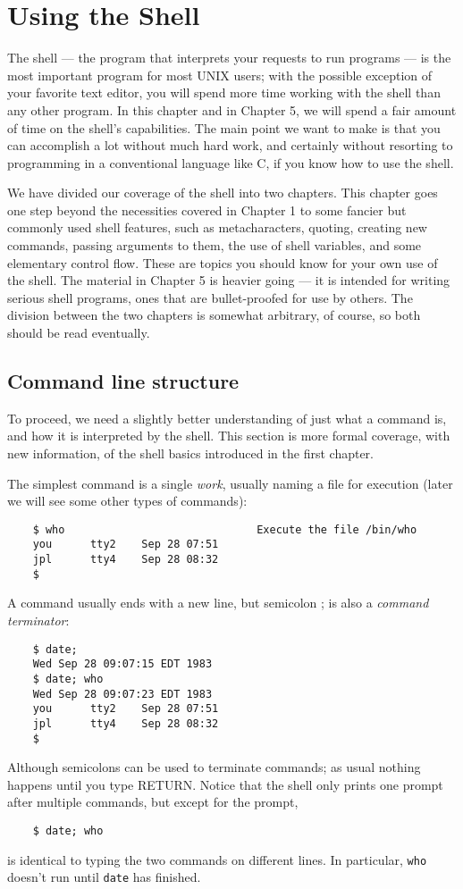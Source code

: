 \chapter{Using the Shell}
\label{chap:using_the_shell}

	The shell --- the program that interprets your requests to run programs --- is
the most important program for most UNIX users; with the possible exception of
your favorite text editor, you will spend more time working with the shell than
any other program. In this chapter and in Chapter 5, we will spend a fair
amount of time on the shell's capabilities. The main point we want to make is
that you can accomplish a lot without much hard work, and certainly without
resorting to programming in a conventional language like C, if you know how
to use the shell.

	We have divided our coverage of the shell into two chapters. This chapter
goes one step beyond the necessities covered in Chapter 1 to some fancier but
commonly used shell features, such as metacharacters, quoting, creating new
commands, passing arguments to them, the use of shell variables, and some
elementary control flow. These are topics you should know for your own use
of the shell. The material in Chapter 5 is heavier going --- it is intended for
writing serious shell programs, ones that are bullet-proofed for use by others.
The division between the two chapters is somewhat arbitrary, of course, so
both should be read eventually.

\section{Command line structure}

	To proceed, we need a slightly better understanding of just what a command
is, and how it is interpreted by the shell. This section is more formal
coverage, with new information, of the shell basics introduced in the first
chapter.

	The simplest command is a single \textit{work}, usually naming a file for execution
(later we will see some other types of commands):
\begin{verbatim}
    $ who                              Execute the file /bin/who
    you      tty2    Sep 28 07:51
    jpl      tty4    Sep 28 08:32
    $
\end{verbatim}
A command usually ends with a new line, but semicolon ; is also a \textit{command terminator}:
\begin{verbatim}
    $ date;
    Wed Sep 28 09:07:15 EDT 1983
    $ date; who
    Wed Sep 28 09:07:23 EDT 1983
    you      tty2    Sep 28 07:51
    jpl      tty4    Sep 28 08:32
    $	
\end{verbatim}
	Although semicolons can be used to terminate commands; as usual nothing
happens until you type RETURN. Notice that the shell only prints one prompt
after multiple commands, but except for the prompt,
\begin{verbatim}
    $ date; who
\end{verbatim}
is identical to typing the two commands on different lines. In particular, \verb=who=
doesn't run until \verb=date= has finished.

